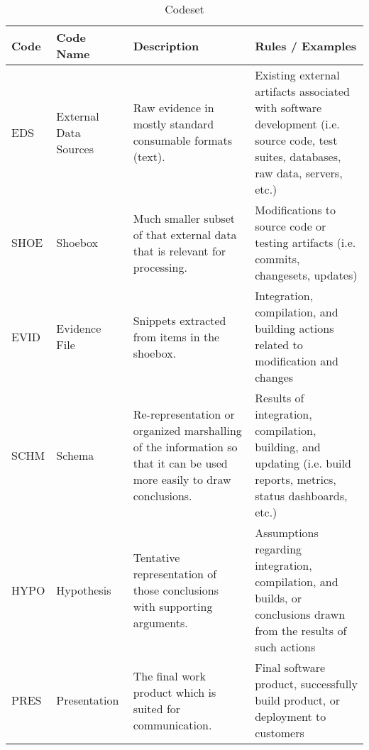 \documentclass{sig-alternate}
\begin{document}
\begin{table*}
\label{table:codeset}
\centering
\caption{Codeset}
\begin{tabular}[b]{ | l | l | p{5.5cm} | p{6.5cm} | }
	\hline
	\rowcolor{black!20!} Code & Code Name & Description & Rules / Examples \\ \hline
	EDS & External Data Sources & Raw evidence in mostly standard consumable formats (text). & Existing external artifacts associated with software development (i.e. source code, test suites, databases, raw data, servers, etc.) \\ \hline
	SHOE & Shoebox & Much smaller subset of that external data that is relevant for processing. & Modifications to source code or testing artifacts (i.e. commits, changesets, updates) \\ \hline
	EVID & Evidence File & Snippets extracted from items in the shoebox. & Integration, compilation, and building actions related to modification and changes \\ \hline
	SCHM & Schema & Re-representation or organized marshalling of the information so that it can be used more easily to draw conclusions. & Results of integration, compilation, building, and updating (i.e. build reports, metrics, status dashboards, etc.) \\ \hline
	HYPO & Hypothesis & Tentative representation of those conclusions with supporting arguments. & Assumptions regarding integration, compilation, and builds, or conclusions drawn from the results of such actions \\ \hline
	PRES & Presentation & The final work product which is suited for communication. & Final software product, successfully build product, or deployment to customers \\ \hline
\end{tabular}
\end{table*}
\end{document}
